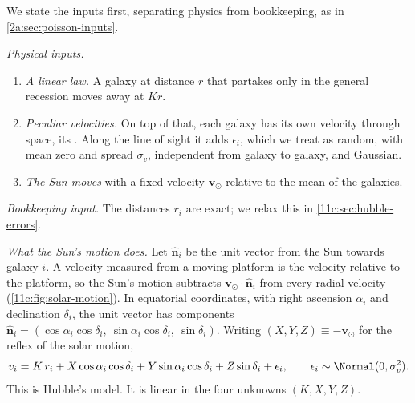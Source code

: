We state the inputs first, separating physics from bookkeeping, as in
\cref{2a:sec:poisson-inputs}.

\emph{Physical inputs.}
\begin{enumerate}[label=(H\arabic*),leftmargin=2.6em,itemsep=1pt]
  \item \emph{A linear law.} A galaxy at distance $r$ that partakes only in the
        general recession moves away at $Kr$.
  \item \emph{Peculiar velocities.} On top of that, each galaxy has its own velocity
        through space, its  . Along the line of sight it adds $\epsilon_i$, which we
        treat as random, with mean zero and spread $\sigma_v$, independent from galaxy
        to galaxy, and Gaussian.
  \item \emph{The Sun moves} with a fixed velocity $\bm v_\odot$ relative to the mean
        of the galaxies.
\end{enumerate}
\emph{Bookkeeping input.} The distances $r_i$ are exact; we relax this in
\cref{11c:sec:hubble-errors}.

\emph{What the Sun's motion does.} Let $\hat{\bm n}_i$ be the unit vector from the
Sun towards galaxy $i$. A velocity measured from a moving platform is the
velocity relative to the platform, so the Sun's motion subtracts
$\bm v_\odot\cdot\hat{\bm n}_i$ from every radial velocity
(\cref{11c:fig:solar-motion}). In equatorial coordinates, with right ascension
$\alpha_i$ and declination $\delta_i$, the unit vector has components
$\hat{\bm n}_i=(\cos\alpha_i\cos\delta_i,\ \sin\alpha_i\cos\delta_i,\ \sin\delta_i)$.
Writing $(X,Y,Z)\equiv-\bm v_\odot$ for the reflex of the solar motion,
\begin{equation}
  v_i=K\,r_i+X\cos\alpha_i\cos\delta_i+Y\sin\alpha_i\cos\delta_i+Z\sin\delta_i+\epsilon_i ,
  \qquad \epsilon_i\sim\Normal(0,\sigma_v^2).
  \label{11c:eq:hubble-model}
\end{equation}
This is Hubble's model. It is linear in the four unknowns $(K,X,Y,Z)$.

